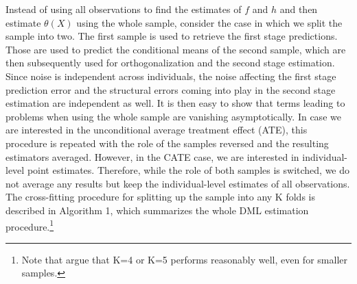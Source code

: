 Instead of using all observations to find the estimates of $f$ and $h$ and then estimate $\theta(X)$ using the whole sample, consider the case in which we split the sample into two. The first sample is used to retrieve the first stage predictions. Those are used to predict the conditional means of the second sample, which are then subsequently used for orthogonalization and the second stage estimation. Since noise is independent across individuals, the noise affecting the first stage prediction error and the structural errors coming into play in the second stage estimation are independent as well. It is then easy to show that terms leading to problems when using the whole sample are vanishing asymptotically. In case we are interested in the unconditional average treatment effect (ATE), this procedure is repeated with the role of the samples reversed and the resulting estimators averaged. However, in the CATE case, we are interested in individual-level point estimates. Therefore, while the role of both samples is switched, we do not average any results but keep the individual-level estimates of all observations. The cross-fitting procedure for splitting up the sample into any K folds is described in Algorithm 1, which summarizes the whole DML estimation procedure.\footnote{Note that \cite{DML2017} argue that K=4 or K=5 performs reasonably well, even for smaller samples.} 

